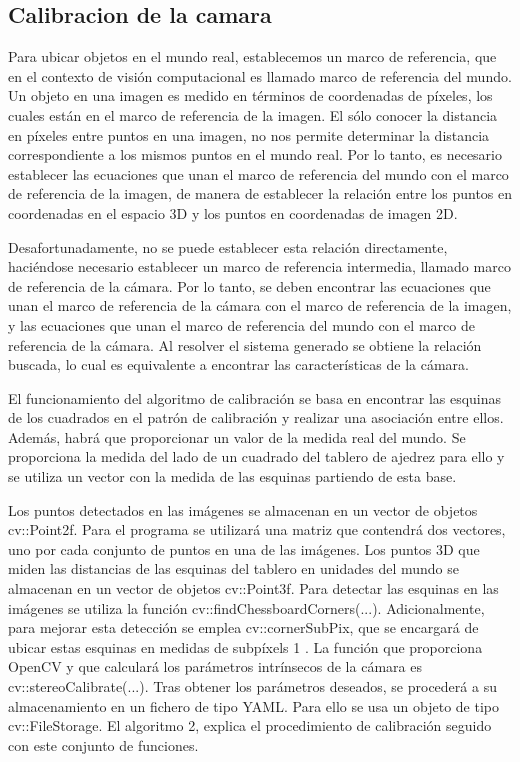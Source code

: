 \subsection{Calibracion de la camara}

Para ubicar objetos en el mundo real, establecemos un marco de referencia, que en el contexto de visión computacional es llamado marco de referencia del mundo. Un objeto en una imagen es medido en términos de coordenadas de píxeles, los cuales están en el marco de referencia de la imagen. El sólo conocer la distancia en píxeles entre puntos en una imagen, no nos permite determinar la distancia correspondiente a los mismos puntos en el mundo real. Por lo tanto, es necesario establecer las ecuaciones que unan el marco de referencia del mundo con el marco de referencia de la imagen, de manera de establecer la relación entre los puntos en coordenadas en el espacio 3D y los puntos en coordenadas de imagen 2D. 

Desafortunadamente, no se puede establecer esta relación directamente, haciéndose necesario establecer un marco de referencia intermedia, llamado marco de referencia de la cámara. Por lo tanto, se deben encontrar las ecuaciones que unan el marco de referencia de la cámara con el marco de referencia de la imagen, y las ecuaciones que unan el marco de referencia del mundo con el marco de referencia de la cámara. Al resolver el sistema generado se obtiene la relación buscada, lo cual es equivalente a encontrar las características de la cámara.



El funcionamiento del algoritmo de calibración se basa en encontrar las esquinas de los
cuadrados en el patrón de calibración y realizar una asociación entre ellos. Además, habrá
que proporcionar un valor de la medida real del mundo. Se proporciona la medida del lado
de un cuadrado del tablero de ajedrez para ello y se utiliza un vector con la medida de las
esquinas partiendo de esta base.


Los puntos detectados en las imágenes se almacenan en un vector de objetos cv::Point2f.
Para el programa se utilizará una matriz que contendrá dos vectores, uno por cada conjunto
de puntos en una de las imágenes. Los puntos 3D que miden las distancias de las esquinas del
tablero en unidades del mundo se almacenan en un vector de objetos cv::Point3f.
Para detectar las esquinas en las imágenes se utiliza la función cv::findChessboardCorners(...). Adicionalmente, para mejorar esta detección se emplea cv::cornerSubPix, que se
encargará de ubicar estas esquinas en medidas de subpíxels 1 .
La función que proporciona OpenCV y que calculará los parámetros intrínsecos de la cámara es cv::stereoCalibrate(...). Tras obtener los parámetros deseados, se procederá a su almacenamiento en un fichero de tipo YAML. Para ello se usa un objeto de tipo cv::FileStorage.
El algoritmo 2, explica el procedimiento de calibración seguido con este conjunto de funciones.

